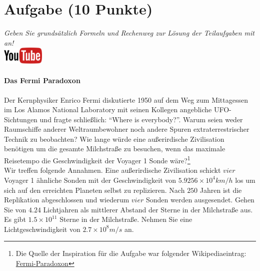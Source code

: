 \documentclass[a4paper, 9pt]{scrartcl}\usepackage[]{graphicx}\usepackage[]{xcolor}
\begin{document}
 
\clearpage

\section{Aufgabe \hfill (10 Punkte)}

\textit{Geben Sie grunds{\"a}tzlich Formeln und Rechenweg zur L{\"o}sung der
  Teilaufgaben mit an!} \\[1Ex]

\hfill\href{https://youtu.be/iCQogS6KhPM}{\includegraphics[width =
  2cm]{img/youtube}} %
\hspace{2Ex}

\paragraph{Das Fermi Paradoxon}



Der Kernphysiker Enrico Fermi diskutierte 1950 auf dem Weg zum Mittagessen
im Los Alamos National Laboratory mit seinen Kollegen angebliche
UFO-Sichtungen und fragte schlie{\ss}lich: "`Where is everybody?"'. Warum seien
weder Raumschiffe anderer Weltraumbewohner noch andere Spuren
extraterrestrischer Technik zu beobachten? Wie lange w{\"u}rde eine au{\ss}erirdische
Zivilisation ben{\"o}tigen um die gesamte Milchstra{\ss}e zu
besuchen, wenn das maximale Reisetempo die Geschwindigkeit der Voyager 1 Sonde w{\"a}re?\footnote{Die Quelle der Inspiration
  für die Aufgabe war folgender Wikipediaeintrag:
  \href{https://de.wikipedia.org/wiki/Fermi-Paradoxon}{Fermi-Paradoxon}}\\[-1ex]

Wir treffen folgende Annahmen. Eine au{\ss}erirdische Zivilisation schickt $vier$
Voyager 1 {\"a}hnliche Sonden mit der Geschwindigkeit von $\ensuremath{5.9256\times 10^{4}}km/h$
los um sich auf den erreichten Planeten selbst zu replizieren. Nach
$250$ Jahren ist die Replikation abgeschlossen und wiederum
$vier$ Sonden werden ausgesendet. Gehen Sie von
$4.24$ Lichtjahren als mittlerer Abstand der Sterne in der
Milchstra{\ss}e aus. Es gibt $\ensuremath{1.5\times 10^{11}}$ Sterne in der Milchstra{\ss}e. Nehmen
Sie eine Lichtgeschwindigkeit von $\ensuremath{2.7\times 10^{8}}m/s$ an.
\end{document}
